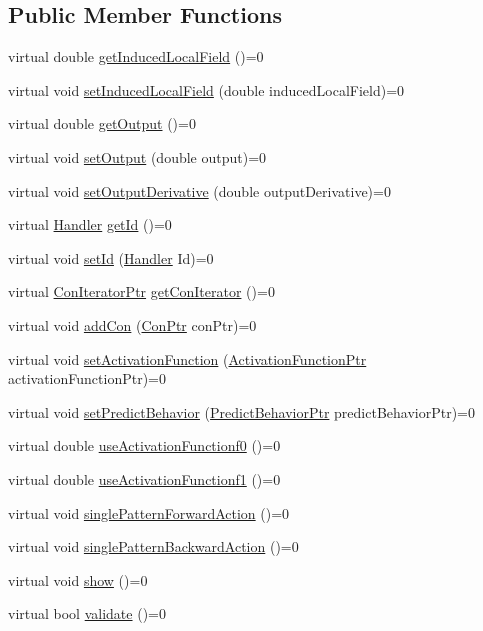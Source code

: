 \subsection*{Public Member Functions}
\begin{DoxyCompactItemize}
\item 
virtual double \hyperlink{class_neuron_a1b7eea569128502e3387f5b50751a119}{getInducedLocalField} ()=0
\item 
virtual void \hyperlink{class_neuron_ab7244964f798eb9cace1cb916f5ef359}{setInducedLocalField} (double inducedLocalField)=0
\item 
virtual double \hyperlink{class_neuron_a43ac0c8461c610bb2b82017d597435e3}{getOutput} ()=0
\item 
virtual void \hyperlink{class_neuron_aae94f78cfa7ed3ce4935f23a3a585f95}{setOutput} (double output)=0
\item 
virtual void \hyperlink{class_neuron_a313a84fcb2bcb6562a659ee69e75c2d5}{setOutputDerivative} (double outputDerivative)=0
\item 
virtual \hyperlink{_a_m_o_r_e_8h_abc871abb71cff6655b8172ee7240b8ef}{Handler} \hyperlink{class_neuron_a1a34edd39fba70be1d18219d5e9e1eea}{getId} ()=0
\item 
virtual void \hyperlink{class_neuron_a65331c891ac34a344d0bb791073a8dd9}{setId} (\hyperlink{_a_m_o_r_e_8h_abc871abb71cff6655b8172ee7240b8ef}{Handler} Id)=0
\item 
virtual \hyperlink{_a_m_o_r_e_8h_a819efaf710ead601ac8241df5e235dd8}{ConIteratorPtr} \hyperlink{class_neuron_ac52554d6ba02e8eec2dd04a150169ec9}{getConIterator} ()=0
\item 
virtual void \hyperlink{class_neuron_a9b991901b252c50c76b5192e2d135c68}{addCon} (\hyperlink{_a_m_o_r_e_8h_a169bb8e5f26ce70bf2b10dec2fb5ee50}{ConPtr} conPtr)=0
\item 
virtual void \hyperlink{class_neuron_ab73922d2dba9f86ab192e2bb87c6a1aa}{setActivationFunction} (\hyperlink{_a_m_o_r_e_8h_a77602a0277a02e5769c3df0adc669b17}{ActivationFunctionPtr} activationFunctionPtr)=0
\item 
virtual void \hyperlink{class_neuron_af21848d0ef33bec5587e4c2702c83e3f}{setPredictBehavior} (\hyperlink{_a_m_o_r_e_8h_a1fb2f1f8fdf1e08c42ef4bdce436af93}{PredictBehaviorPtr} predictBehaviorPtr)=0
\item 
virtual double \hyperlink{class_neuron_a78c90ab1f5d18b2d7cb8f366391b7821}{useActivationFunctionf0} ()=0
\item 
virtual double \hyperlink{class_neuron_ad8c510fc08c5d4cf3a9614fbb98867b6}{useActivationFunctionf1} ()=0
\item 
virtual void \hyperlink{class_neuron_a80b821200bd08777ea6f3d686dffd760}{singlePatternForwardAction} ()=0
\item 
virtual void \hyperlink{class_neuron_a936435da3fde7254d7051163170009be}{singlePatternBackwardAction} ()=0
\item 
virtual void \hyperlink{class_neuron_ae18a86f9b67c63a6fcb28c813b47a38d}{show} ()=0
\item 
virtual bool \hyperlink{class_neuron_a37f57f44fefa328ea0b7ab32b52c853e}{validate} ()=0
\end{DoxyCompactItemize}
